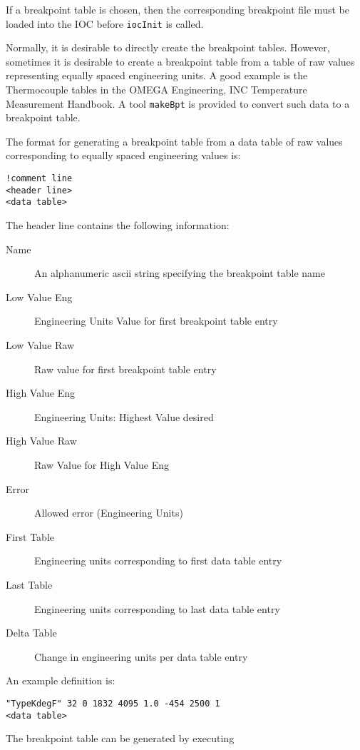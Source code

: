 If a breakpoint table is chosen, then the corresponding breakpoint file must be loaded into the IOC before \verb|iocInit| is called.

Normally, it is desirable to directly create the breakpoint tables.
However, sometimes it is desirable to create a breakpoint table from a table of raw values representing equally spaced engineering units.
A good example is the Thermocouple tables in the OMEGA Engineering, INC Temperature Measurement Handbook.
A tool \verb|makeBpt| is provided to convert such data to a breakpoint table.

The format for generating a breakpoint table from a data table of raw values corresponding to equally spaced engineering values is:

\begin{lstlisting}[language=dbd]
!comment line
<header line>
<data table>
\end{lstlisting}

The header line contains the following information:

\begin{description}
\item [Name] An alphanumeric ascii string specifying the breakpoint table name
\item [Low Value Eng] Engineering Units Value for first breakpoint table entry
\item [Low Value Raw] Raw value for first breakpoint table entry
\item [High Value Eng] Engineering Units: Highest Value desired
\item [High Value Raw] Raw Value for High Value Eng
\item [Error] Allowed error (Engineering Units)
\item [First Table] Engineering units corresponding to first data table entry
\item [Last Table] Engineering units corresponding to last data table entry
\item [Delta Table] Change in engineering units per data table entry
\end{description}

 An example definition is:

\begin{lstlisting}[language=dbd]
"TypeKdegF" 32 0 1832 4095 1.0 -454 2500 1
<data table>
\end{lstlisting}

The breakpoint table can be generated by executing

